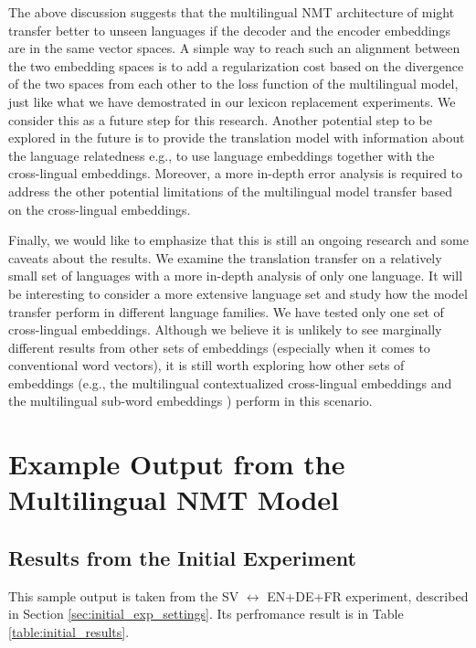 \documentclass[thesis,fonts=libertine]{cluu}
\begin{document}
The above discussion suggests that the multilingual NMT architecture of \textcite{Johnson:2016aa} might transfer better to unseen languages if the decoder and the encoder embeddings are in the same vector spaces. A simple way to reach such an alignment between the two embedding spaces is to add a regularization cost based on the divergence of the two spaces from each other to the loss function of the multilingual model, just like what we have demostrated in our lexicon replacement experiments. We consider this as a future step for this research. Another potential step to be explored in the future is to provide the translation model with information about the language relatedness e.g., to use language embeddings \parencite{littell-etal-2017-uriel} together with the cross-lingual embeddings. Moreover, a more in-depth error analysis is required to address the other potential limitations of the multilingual model transfer based on the cross-lingual embeddings.

Finally, we would like to emphasize that this is still an ongoing research and some caveats about the results. We examine the translation transfer on a relatively small set of languages with a more in-depth analysis of only one language. It will be interesting to consider a more extensive language set and study how the model transfer perform in different language families. We have tested only one set of cross-lingual embeddings. Although we believe it is unlikely to see marginally different results from other sets of embeddings (especially when it comes to conventional word vectors), it is still worth exploring how other sets of embeddings (e.g., the multilingual contextualized cross-lingual embeddings \textcite{devlin-etal-2019-bert} and the multilingual sub-word embeddings \textcite{Heinzerling:2017aa}) perform in this scenario. 

\appendix
\chapter{Example Output from the Multilingual NMT Model}
\label{chap:example_output}

\section{Results from the Initial Experiment}
This sample output is taken from the SV $\leftrightarrow$ EN+DE+FR experiment, described in Section \ref{sec:initial_exp_settings}. Its perfromance result is in Table \ref{table:initial_results}.
\end{document}
